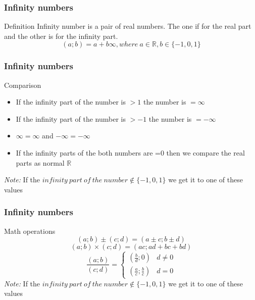 \documentclass[12pt]{beamer}
\begin{document}
	\begin{frame}
		\frametitle{Infinity numbers}
		\begin{block}{Definition}
			Infinity number is a pair of real numbers. The one if for the real part and the other is for the infinity part.
			$$ (a; b) = a + b\infty, where\ a \in \mathbb{R}, b \in \{-1, 0, 1\}$$
		\end{block}
	\end{frame}

	\begin{frame}
		\frametitle{Infinity numbers}
		\begin{block}{Comparison}
			\begin{itemize}
				\item If the infinity part of the number is $>1$ the number is $=\infty$
				\item If the infinity part of the number is $>-1$ the number is $=-\infty$
				\item $\infty = \infty$ and $-\infty = -\infty$
				\item If the infinity parts of the both numbers are =0 then we compare the real parts as normal $\mathbb{R}$
			\end{itemize}
			\small{\textit{Note:} If the $infinity\ part\ of\ the\ number \notin \{-1, 0, 1\}$ we get it to one of these values}
		\end{block}
	\end{frame}

	\begin{frame}
		\frametitle{Infinity numbers}
		\begin{block}{Math operations}
			$$ (a; b) \pm (c; d) = (a \pm c; b \pm d)$$
			$$ (a; b) \times (c; d) = (ac; ad + bc + bd)$$
			\[ \frac{ (a; b)}{ (c; d)} = 
				\begin{cases}
					 (\frac{b}{d}; 0)           & d \neq 0\\
					 (\frac{a}{c}; \frac{b}{c}) & d = 0
				\end{cases} 
            \]   
			\small{\textit{Note:} If the $infinity\ part\ of\ the\ number \notin \{-1, 0, 1\}$ we get it to one of these values}
		\end{block}
	\end{frame}
\end{document}
